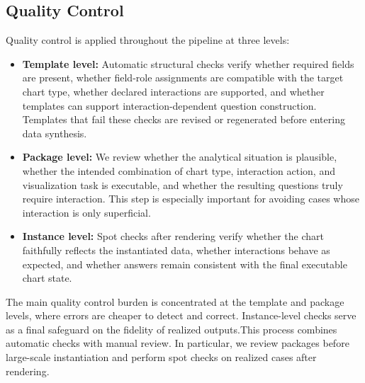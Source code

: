 \documentclass[review,journal,hideappendix]{vgtc} %
\begin{document}
\subsection{Quality Control}

Quality control is applied throughout the pipeline at three levels:
\begin{itemize}[leftmargin=*]
    \item \textbf{Template level:} Automatic structural checks verify whether required fields are present, whether field-role assignments are compatible with the target chart type, whether declared interactions are supported, and whether templates can support interaction-dependent question construction. Templates that fail these checks are revised or regenerated before entering data synthesis.
    \item \textbf{Package level:} We review whether the analytical situation is plausible, whether the intended combination of chart type, interaction action, and visualization task is executable, and whether the resulting questions truly require interaction. This step is especially important for avoiding cases whose interaction is only superficial.
    \item \textbf{Instance level:} Spot checks after rendering verify whether the chart faithfully reflects the instantiated data, whether interactions behave as expected, and whether answers remain consistent with the final executable chart state.
\end{itemize}
The main quality control burden is concentrated at the template and package levels, where errors are cheaper to detect and correct. Instance-level checks serve as a final safeguard on the fidelity of realized outputs.This process combines automatic checks with manual review. In particular, we review packages before large-scale instantiation and perform spot checks on realized cases after rendering.

\end{document}
